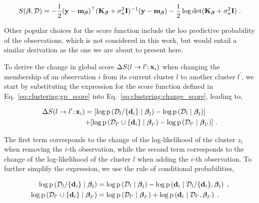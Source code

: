 \begin{equation}
  S(\boldsymbol{\beta},\mathcal{D}) = -\frac{1}{2} (\mathbf{y}-\mathbf{m}_{\boldsymbol{\beta}})^{\top} (\mathbf{K}_{\boldsymbol{\beta}} + \sigma_n^2 \mathbf{I})^{-1} (\mathbf{y}-\mathbf{m}_{\boldsymbol{\beta}}) - \frac{1}{2} \log \det (\mathbf{K}_{\boldsymbol{\beta}} + \sigma_n^2 \mathbf{I}) \;.
  \label{eq:clustering:gp_score}
\end{equation}

Other popular choices for the score function include the \gls{loo} predictive probability of the observations, which is not considered in this work, but would entail a similar derivation as the one we are about to present here.

\smallskip
To derive the change in global score $\Delta S (l \rightarrow l^{\prime}; \mathbf{x}_i)$ when changing the membership of an observation $i$ from its current cluster $l$ to another cluster $l^\prime$, we start by substituting the expression for the score function defined in Eq.~\eqref{eq:clustering:gp_score} into Eq.~\eqref{eq:clustering:change_score}, leading to,

\begin{equation}
  \left.
\begin{aligned}
  \Delta S (l \rightarrow l^{\prime}; \mathbf{x}_i) &= [\log \mathrm{p} \left( \mathcal{D}_{l}/ \{\mathbf{d}_i\} \mid \boldsymbol{\beta}_l \right) - \log \mathrm{p} \left( \mathcal{D}_{l}\mid \boldsymbol{\beta}_l \right)]\\
  & \textcolor{black}{+} [\log \mathrm{p} \left( \mathcal{D}_{l^\prime} \cup \{\mathbf{d}_i\} \mid \boldsymbol{\beta}_{l^\prime} \right)-\log \mathrm{p} \left( \mathcal{D}_{l^\prime}\mid \boldsymbol{\beta}_{l^\prime} \right)]\;.
\end{aligned}
  \right.
  \label{eq:clustering:delta_score}
\end{equation}

The first term corresponds to the change of the log-likelihood of the cluster $z_i$ when removing the $i$-th observation, while the second term corresponds to the change of the log-likelihood of the cluster $l$ when adding the $i$-th observation. To further simplify the expression, we use the rule of conditional probabilities,

\begin{equation}
  \left. 
  \begin{aligned}
    \log \mathrm{p} \left( \mathcal{D}_{l}/ \{\mathbf{d}_i\} \mid \boldsymbol{\beta}_l \right) &= \log \mathrm{p} \left( \mathcal{D}_{l} \mid \boldsymbol{\beta}_l \right) - \log \mathrm{p} \left( \mathbf{d}_i \mid \mathcal{D}_{l}/\{\mathbf{d}_i\}, \boldsymbol{\beta}_l \right) \;,\\
    \log \mathrm{p} \left( \mathcal{D}_{l^\prime} \cup \{\mathbf{d}_i\} \mid \boldsymbol{\beta}_{l^\prime} \right) &= \log \mathrm{p} \left( \mathcal{D}_{l^\prime} \mid \boldsymbol{\beta}_{l^\prime} \right) + \log \mathrm{p} \left( \mathbf{d}_i \mid \mathcal{D}_{l^\prime}, \boldsymbol{\beta}_{l^\prime} \right) \;.
  \end{aligned}
  \right.
  \label{eq:clustering:delta_score_2}
\end{equation}

